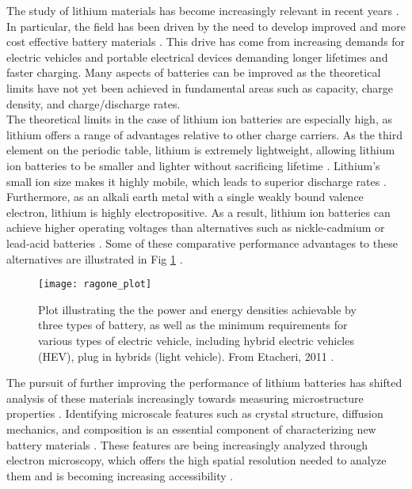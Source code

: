 



 

The study of lithium materials has become increasingly relevant in recent years \cite{nitta_li-ion_2015}.  In particular, the field has been driven by the need to develop improved  and more cost effective battery materials \cite{nitta_li-ion_2015}.  This drive has come from increasing demands for electric vehicles and portable electrical devices demanding longer lifetimes and faster charging.  Many aspects of  batteries can be improved as the theoretical limits have not yet been achieved in fundamental areas such as capacity, charge density, and charge/discharge rates. \\


The theoretical limits in the case of lithium ion batteries are especially high, as lithium offers a range of advantages relative to other charge carriers. As the third element on the periodic table, lithium is extremely lightweight, allowing lithium ion batteries to be smaller and lighter without sacrificing lifetime \cite{etacheri_challenges_2011}.  Lithium's small ion size makes it highly mobile, which leads to superior discharge rates  \cite{etacheri_challenges_2011}.   Furthermore, as an alkali earth metal with a single weakly bound valence electron, lithium is highly electropositive.   As a result, lithium ion batteries can achieve higher operating voltages than alternatives such as nickle-cadmium or lead-acid batteries \cite{etacheri_challenges_2011}.  Some of these comparative performance advantages to these alternatives are illustrated in Fig \ref{ragone} \cite{etacheri_challenges_2011}.\\

\begin{figure}
	\centering
	\texttt{[image: ragone\_plot]}
	\caption{Plot illustrating the the power and energy densities achievable by three types of battery, as well as the minimum requirements for various types of electric vehicle, including hybrid electric vehicles (HEV), plug in hybrids (light vehicle). From Etacheri, 2011 \cite{etacheri_challenges_2011}. }
	\label{ragone}
	
\end{figure}
The pursuit of further improving the performance of lithium batteries has shifted analysis of these materials increasingly towards measuring microstructure properties \cite{lu_lithium_2012,arthur_spontaneous_2016, muller_quantification_2018}. Identifying microscale features such as crystal structure, diffusion mechanics, and composition is an essential component of characterizing new battery materials \cite{van_der_ven_first-principles_2001}. These features are being increasingly analyzed through electron microscopy, which offers the high spatial resolution needed to analyze them and is becoming increasing accessibility   \cite{chiu_aqueous_2013,inkson_2_2016, hansen_atomic-resolution_2001}. \\

